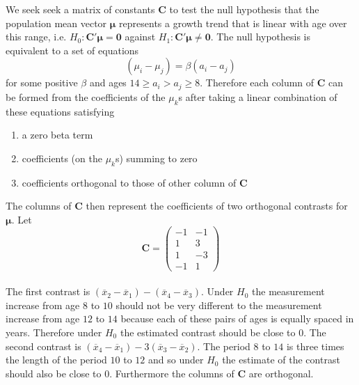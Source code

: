 \documentclass[a4paper,11pt]{article}
\begin{document}
We seek seek a matrix of constants $\mathbf{C}$ to test the null hypothesis that the population mean vector $\bm{\mu}$ represents a growth trend that is linear with age over this range, i.e. $H_0 : \mathbf{C'}\bm{\mu}=\mathbf{0}$ against $H_1 : \mathbf{C'}\bm{\mu} \ne \mathbf{0}$. The null hypothesis is equivalent to a set of equations
\begin{equation}
(\mu_i-\mu_j) = \beta(a_i-a_j)
\label{setofeqns}
\end{equation}
for some positive $\beta$ and ages $14\ge a_i > a_j \ge 8$. Therefore each column of $\mathbf{C}$ can be formed from the coefficients of the $\mu_k$s after taking a linear combination of these equations satisfying
\begin{enumerate}
\item a zero beta term
\item coefficients (on the $\mu_k$s) summing to zero
\item coefficients orthogonal to those of other column of $\mathbf{C}$
\end{enumerate}
The columns of $\mathbf{C}$ then represent the coefficients of two orthogonal contrasts for $\bm{\mu}$. Let
\begin{equation*}
\mathbf{C}=
\begin{pmatrix} 
-1 & -1 \\
 1 &  3 \\
 1 & -3 \\
-1 &  1
\end{pmatrix}
\end{equation*}\\
 The first contrast is $(\overline{x}_2-\overline{x}_1)-(\overline{x}_4-\overline{x}_3)$. Under $H_0$ the measurement increase from age $8$ to $10$ should not be very different to the measurement increase from age $12$ to $14$ because each of these pairs of ages is equally spaced in years. Therefore under $H_0$ the estimated contrast should be close to $0$. The second contrast is $(\overline{x}_4-\overline{x}_1)-3(\overline{x}_3-\overline{x}_2)$. The period $8$ to $14$ is three times the length of the period $10$ to $12$ and so under $H_0$ the estimate of the contrast should also be close to $0$. Furthermore the columns of $\mathbf{C}$ are orthogonal.\\
\end{document}
